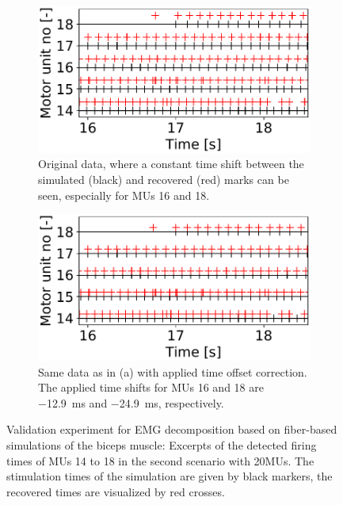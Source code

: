 \begin{figure}
  \centering%
  \begin{subfigure}[t]{0.47\textwidth}%
    \centering%
    \includegraphics[width=\textwidth]{images/results/application/emg_20mus-40s_new-noshift2.pdf}%
    \caption{Original data, where a constant time shift between the simulated (black) and recovered (red) marks can be seen, especially for MUs 16 and 18.}%
    \label{fig:newmus_nocorrection}%
  \end{subfigure}
  \hfill
  \begin{subfigure}[t]{0.47\textwidth}%
    \centering%
    \includegraphics[width=\textwidth]{images/results/application/emg_20mus-40s_new-shift2.pdf}%
    \caption{Same data as in (a) with applied time offset correction. The applied time shifts for MUs 16 and 18 are \SI{-12.9}{\ms} and \SI{-24.9}{\ms}, respectively.}%
    \label{fig:newmus_withcorrection}%
  \end{subfigure}
  \caption{Validation experiment for EMG decomposition based on fiber-based simulations of the biceps  muscle: Excerpts of the detected firing times of MUs 14 to 18 in the second scenario with 20MUs. The stimulation times of the simulation are given by black markers, the recovered times are visualized by red crosses.}%
  \label{fig:newmus_shifting}%
\end{figure}

